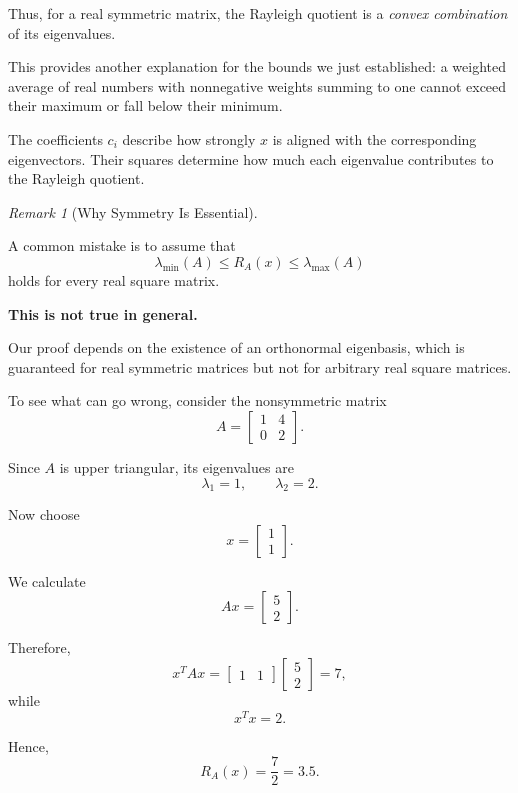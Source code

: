 \documentclass[14pt,letterpaper]{article}
\theoremstyle{plain}
\theoremstyle{definition}
\theoremstyle{remark}
\newtheorem{remark}[theorem]{Remark}
\begin{document}
Thus, for a real symmetric matrix,
the Rayleigh quotient is a
\emph{convex combination} of its
eigenvalues.

This provides another explanation
for the bounds we just established:
a weighted average of real numbers
with nonnegative weights summing
to one cannot exceed their maximum
or fall below their minimum.

The coefficients $c_i$ describe
how strongly $x$ is aligned with
the corresponding eigenvectors.
Their squares determine how much
each eigenvalue contributes to
the Rayleigh quotient.


\begin{remark}[Why Symmetry Is Essential]
\label{rem:rayleigh_symmetry}

A common mistake is to assume that
\[
\lambda_{\min}(A)
\leq R_A(x)\leq
\lambda_{\max}(A)
\]
holds for every real square matrix.

\textbf{This is not true in general.}

Our proof depends on the existence
of an orthonormal eigenbasis, which
is guaranteed for real symmetric
matrices but not for arbitrary
real square matrices.

To see what can go wrong, consider
the nonsymmetric matrix
\[
A=
\begin{bmatrix}
1&4\\
0&2
\end{bmatrix}.
\]

Since $A$ is upper triangular,
its eigenvalues are
\[
\lambda_1=1,
\qquad
\lambda_2=2.
\]

Now choose
\[
x=
\begin{bmatrix}
1\\
1
\end{bmatrix}.
\]

We calculate
\[
Ax=
\begin{bmatrix}
5\\
2
\end{bmatrix}.
\]

Therefore,
\[
x^TAx
=
\begin{bmatrix}1&1\end{bmatrix}
\begin{bmatrix}5\\2\end{bmatrix}
=7,
\]
while
\[
x^Tx=2.
\]

Hence,
\[
\boxed{
R_A(x)=\frac72=3.5.
}
\]


\end{remark}
\end{document}

